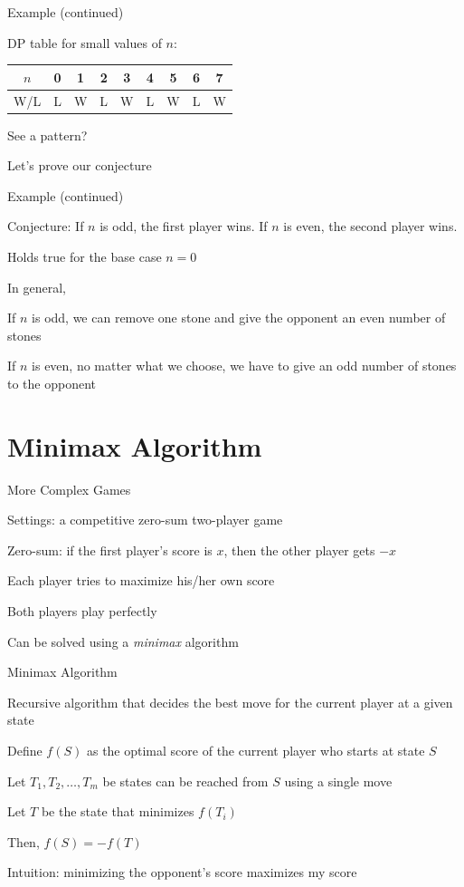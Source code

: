 \documentclass[13pt,onlymath]{beamer}
\begin{document}
\begin{frame}{Example (continued)}
\BIT
\item DP table for small values of $n$:

\begin{center}
\begin{tabular}{|c|cccccccc|}
\hline
$n$&0&1&2&3&4&5&6&7 \\ \hline
W/L&L&W&L&W&L&W&L&W \\
\hline
\end{tabular}
\end{center}
\vfill
\item See a pattern?
\vfill
\item Let's prove our conjecture
\EIT
\end{frame}

\begin{frame}{Example (continued)}
\BIT
\item Conjecture: If $n$ is odd, the first player wins. If $n$ is even, the second player wins.
\vfill
\item Holds true for the base case $n=0$
\item In general,
\BIT
\item If $n$ is odd, we can remove one stone and give the opponent an even number of stones
\item If $n$ is even, no matter what we choose, we have to give an odd number of stones to the opponent
\EIT
\EIT
\end{frame}


\section{Minimax Algorithm}

\begin{frame}{More Complex Games}
\BIT
\item Settings: a competitive zero-sum two-player game
\item Zero-sum: if the first player's score is $x$, then the other player gets $-x$
\item Each player tries to maximize his/her own score
\item Both players play perfectly
\vfill
\item Can be solved using a \emph{minimax} algorithm
\EIT
\end{frame}

\begin{frame}{Minimax Algorithm}
\BIT
\item Recursive algorithm that decides the best move for the current player at a given state
\item Define $f(S)$ as the optimal score of the current player who starts at state $S$
\item Let $T_1, T_2, \ldots, T_m$ be states can be reached from $S$ using a single move
\item Let $T$ be the state that minimizes $f(T_i)$
\item Then, $f(S) = -f(T)$
\BIT
\item Intuition: minimizing the opponent's score maximizes my score
\EIT
\EIT
\end{frame}
\end{document}
